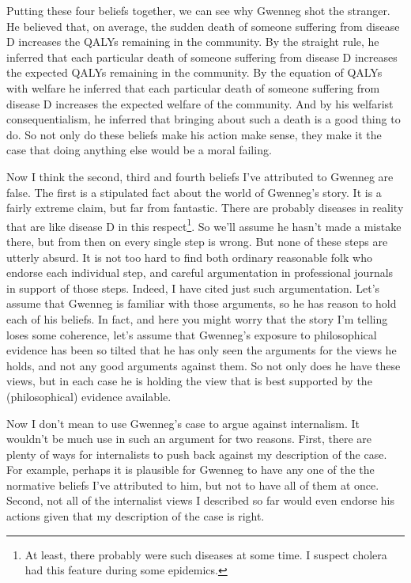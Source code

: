 \documentclass[
  10pt,
  letterpaper,
  twoside]{scrbook}
\begin{document}
Putting these four beliefs together, we can see why {Gwenneg} shot the
stranger. He believed that, on average, the sudden death of someone
suffering from disease D increases the QALYs remaining in the community.
By the straight rule, he inferred that each particular death of someone
suffering from disease D increases the expected QALYs remaining in the
community. By the equation of QALYs with welfare he inferred that each
particular death of someone suffering from disease D increases the
expected welfare of the community. And by his welfarist
consequentialism, he inferred that bringing about such a death is a good
thing to do. So not only do these beliefs make his action make sense,
they make it the case that doing anything else would be a moral failing.

Now I think the second, third and fourth beliefs I've attributed to
{Gwenneg} are false. The first is a stipulated fact about the world of
{Gwenneg}'s story. It is a fairly extreme claim, but far from fantastic.
There are probably diseases in reality that are like disease D in this
respect\footnote{At least, there probably were such diseases at some
  time. I suspect cholera had this feature during some epidemics.}. So
we'll assume he hasn't made a mistake there, but from then on every
single step is wrong. But none of these steps are utterly absurd. It is
not too hard to find both ordinary reasonable folk who endorse each
individual step, and careful argumentation in professional journals in
support of those steps. Indeed, I have cited just such argumentation.
Let's assume that {Gwenneg} is familiar with those arguments, so he has
reason to hold each of his beliefs. In fact, and here you might worry
that the story I'm telling loses some coherence, let's assume that
{Gwenneg}'s exposure to philosophical evidence has been so tilted that
he has only seen the arguments for the views he holds, and not any good
arguments against them. So not only does he have these views, but in
each case he is holding the view that is best supported by the
(philosophical) evidence available.

Now I don't mean to use {Gwenneg}'s case to argue against internalism.
It wouldn't be much use in such an argument for two reasons. First,
there are plenty of ways for internalists to push back against my
description of the case. For example, perhaps it is plausible for
{Gwenneg} to have any one of the the normative beliefs I've attributed
to him, but not to have all of them at once. Second, not all of the
internalist views I described so far would even endorse his actions
given that my description of the case is right.
\end{document}

